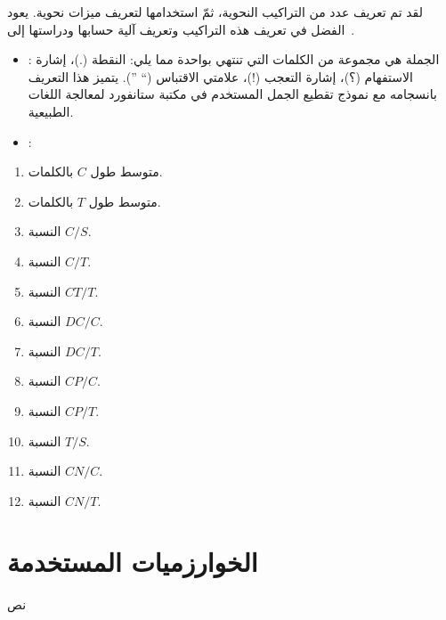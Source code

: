 لقد تم تعريف عدد من التراكيب النحوية، ثمّ استخدامها لتعريف ميزات نحوية.
يعود الفضل في تعريف هذه التراكيب وتعريف آلية حسابها ودراستها إلى~\cite{lu2010}.
\begin{itemize}
	\item 
	:
	الجملة هي مجموعة من الكلمات التي تنتهي بواحدة مما يلي:
	النقطة (.)، إشارة الاستفهام (؟)، إشارة التعجب (!)، علامتي الاقتباس (`` '').
	يتميز هذا التعريف بانسجامه مع نموذج تقطيع الجمل المستخدم في مكتبة ستانفورد لمعالجة اللغات الطبيعية.
	\item 
	:
	
\end{itemize}

\begin{enumerate}[resume]
	\item 
	متوسط طول $C$ بالكلمات.
	\item 
	متوسط طول $T$ بالكلمات.
	\item 
	النسبة $C/S$.
	\item 
	النسبة $C/T$.
	\item 
	النسبة $CT/T$.
	\item 
	النسبة $DC/C$.
	\item 
	النسبة $DC/T$.
	\item 
	النسبة $CP/C$.
	\item 
	النسبة $CP/T$.
	\item 
	النسبة $T/S$.
	\item 
	النسبة $CN/C$.
	\item 
	النسبة $CN/T$.
\end{enumerate}



\section{الخوارزميات المستخدمة}
نص


